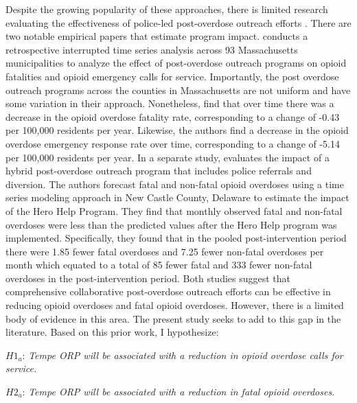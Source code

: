 Despite the growing popularity of these approaches, there is limited research evaluating the effectiveness of police-led post-overdose outreach efforts \parencite{bailey_scoping_2023, yatsco_developing_2020}. There are two notable empirical papers that estimate program impact. \textcite{xuan_association_2023} conducts a retrospective interrupted time series analysis across 93 Massachusetts municipalities to analyze the effect of post-overdose outreach programs on opioid fatalities and opioid emergency calls for service. Importantly, the post overdose outreach programs across the counties in Massachusetts are not uniform and have some variation in their approach. Nonetheless, \textcite{xuan_association_2023} find that over time there was a decrease in the opioid overdose fatality rate, corresponding to a change of -0.43 per 100,000 residents per year. Likewise, the authors find a decrease in the opioid overdose emergency response rate over time, corresponding to a change of -5.14 per 100,000 residents per year. In a separate study, \textcite{donnelly_law_2022} evaluates the impact of a hybrid post-overdose outreach program that includes police referrals and diversion. The authors forecast fatal and non-fatal opioid overdoses using a time series modeling approach in New Castle County, Delaware to estimate the impact of the Hero Help Program. They find that monthly observed fatal and non-fatal overdoses were less than the predicted values after the Hero Help program was implemented. Specifically, they found that in the pooled post-intervention period there were 1.85 fewer fatal overdoses and 7.25 fewer non-fatal overdoses per month which equated to a total of 85 fewer fatal and 333 fewer non-fatal overdoses in the post-intervention period. Both studies suggest that comprehensive collaborative post-overdose outreach efforts can be effective in reducing opioid overdoses and fatal opioid overdoses. However, there is a limited body of evidence in this area. The present study seeks to add to this gap in the literature. Based on this prior work, I hypothesize: 

\begin{flushleft}
\(H1_a\): \textit{Tempe ORP will be associated with a reduction in opioid overdose calls for service.}
\end{flushleft}

\begin{flushleft}
\(H2_a\): \textit{Tempe ORP will be associated with a reduction in fatal opioid overdoses.}
\end{flushleft}

